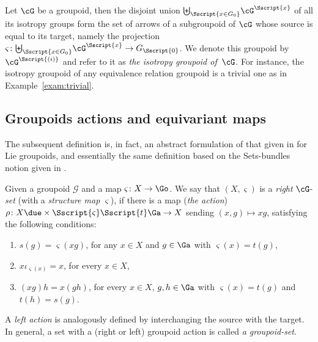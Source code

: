 \begin{Example}\label{exam:IsotropyGrpd}Let $\cG$ be a groupoid, then the disjoint union ${\biguplus}_{\Sscript{x \in G_0}} \cG^{\Sscript{x}}$ of all its isotropy groups form the set of arrows of a subgroupoid of $\cG$ whose source is equal to its target, namely the projection $\varsigma\colon {\biguplus}_{\Sscript{x \in G_0}} \cG^{\Sscript{x}} \to G_{\Sscript{0}}$. We denote this groupoid by $\cG^{\Sscript{(i)}}$ and refer to it as \emph{the isotropy groupoid of~$\cG$}. For instance, the isotropy groupoid of any equivalence relation groupoid is a trivial one as in Example~\ref{exam:trivial}.
\end{Example}

\subsection{Groupoids actions and equivariant maps}\label{ssec:Grpd1}
The subsequent definition is, in fact, an abstract formulation of that given in \cite[Definition~1.6.1]{Mackenzie:2005} for Lie groupoids, and essentially the same definition based on the Sets-bundles notion given in \cite[Definition~1.11]{Renault:1980}.

\begin{Definition}\label{def:Gset}Given a groupoid $\mathcal{G}$ and a map $\varsigma\colon X \to \Go$. We say that $(X,\varsigma)$ is a \emph{right} $\cG$-\emph{set} (with a \emph{structure map} $\varsigma$), if there is a map (\emph{the action}) $\rho\colon X \due \times {\Sscript{\varsigma}} { \Sscript{{t}}} \Ga \to X$ sending $(x,g) \mapsto xg$, satisfying the following conditions:
\begin{enumerate}[1)]\itemsep=0pt
\item $s(g)=\varsigma(xg)$, for any $x \in X$ and $g \in \Ga$ with $\varsigma(x)=t(g)$,
\item $x \iota_{\varsigma(x)}= x$, for every $x \in X$,
\item $ (xg)h= x(gh)$, for every $x \in X$, $g,h \in \Ga$ with $\varsigma(x)={t}(g)$ and $t(h)=s(g)$.
\end{enumerate}
\end{Definition}

A \emph{left action} is analogously defined by interchanging the source with the target. In general, a set with a (right or left) groupoid action is called \emph{a groupoid-set}.

